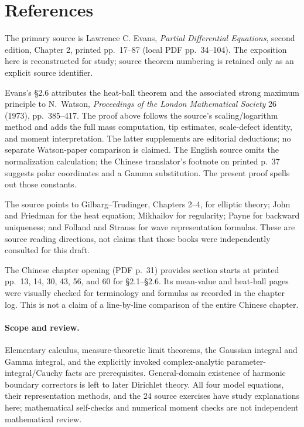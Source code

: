 \section{References}
\label{sec:2-6}

The primary source is Lawrence C. Evans, \emph{Partial Differential
Equations}, second edition, Chapter 2, printed pp.~17--87
(local PDF pp.~34--104). The exposition here is reconstructed for study;
source theorem numbering is retained only as an explicit source identifier.

Evans's \S2.6 attributes the heat-ball theorem and the associated
strong maximum principle to N.~Watson, \emph{Proceedings of the London
Mathematical Society} 26 (1973), pp.~385--417.
The proof above follows the source's scaling/logarithm method and adds
the full mass computation, tip estimates, scale-defect identity, and
moment interpretation. The latter supplements are editorial deductions;
no separate Watson-paper comparison is claimed.
The English source omits the normalization calculation; the Chinese
translator's footnote on printed p.~37 suggests polar coordinates and
a Gamma substitution. The present proof spells out those constants.

The source points to Gilbarg--Trudinger, Chapters 2--4, for elliptic
theory; John and Friedman for the heat equation; Mikhailov for
regularity; Payne for backward uniqueness; and Folland and Strauss
for wave representation formulas. These are source reading directions,
not claims that those books were independently consulted for this draft.

The Chinese chapter opening (PDF p.~31) provides section starts at
printed pp.~13, 14, 30, 43, 56, and 60 for \S2.1--\S2.6.
Its mean-value and heat-ball pages were visually checked for terminology
and formulas as recorded in the chapter log. This is not a claim of
a line-by-line comparison of the entire Chinese chapter.

\paragraph{Scope and review.}
Elementary calculus, measure-theoretic limit theorems, the Gaussian
integral and Gamma integral, and the explicitly invoked complex-analytic
parameter-integral/Cauchy facts are prerequisites.
General-domain existence of harmonic boundary correctors is left to
later Dirichlet theory. All four model equations, their representation
methods, and the 24 source exercises have study explanations here;
mathematical self-checks and numerical moment checks are not independent
mathematical review.
